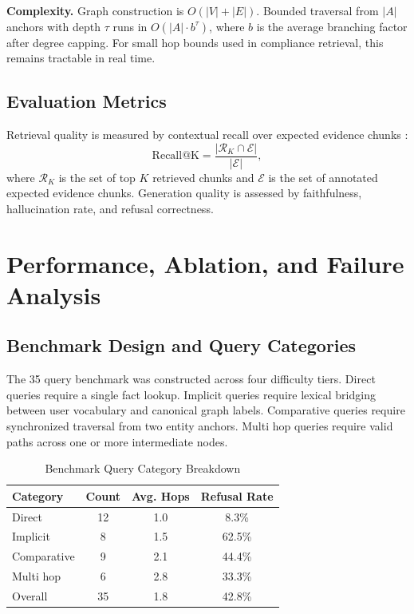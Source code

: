 \documentclass[conference]{IEEEtran}
\begin{document}
\noindent\textbf{Complexity.} Graph construction is $O(|V|+|E|)$. Bounded traversal from $|A|$ anchors with depth $\tau$ runs in $O(|A| \cdot b^{\tau})$, where $b$ is the average branching factor after degree capping. For small hop bounds used in compliance retrieval, this remains tractable in real time.

\subsection{Evaluation Metrics}
Retrieval quality is measured by contextual recall over expected evidence chunks \cite{msmarco2016,trec2020}:
\begin{equation}
  \mathrm{Recall@K} =
  \frac{|\mathcal{R}_K \cap \mathcal{E}|}{|\mathcal{E}|},
\end{equation}
where $\mathcal{R}_K$ is the set of top $K$ retrieved chunks and $\mathcal{E}$ is the set of annotated expected evidence chunks. Generation quality is assessed by faithfulness, hallucination rate, and refusal correctness.

\section{Performance, Ablation, and Failure Analysis}
\subsection{Benchmark Design and Query Categories}
The 35 query benchmark was constructed across four difficulty tiers. Direct queries require a single fact lookup. Implicit queries require lexical bridging between user vocabulary and canonical graph labels. Comparative queries require synchronized traversal from two entity anchors. Multi hop queries require valid paths across one or more intermediate nodes.

\begin{table}[htbp]
  \caption{Benchmark Query Category Breakdown}
  \label{tab:query_cats}
  \centering
  \begin{tabular}{lccc}
    \toprule
    Category & Count & Avg. Hops & Refusal Rate \\
    \midrule
    Direct & 12 & 1.0 & 8.3\% \\
    Implicit & 8 & 1.5 & 62.5\% \\
    Comparative & 9 & 2.1 & 44.4\% \\
    Multi hop & 6 & 2.8 & 33.3\% \\
    \midrule
    Overall & 35 & 1.8 & 42.8\% \\
    \bottomrule
  \end{tabular}
\end{table}
\end{document}
